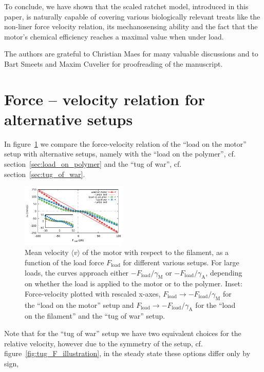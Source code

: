 \documentclass[aps,pre,twocolumn,showpacs,showkeys,superscriptaddress,floatfix]{revtex4-1}
\begin{document}
To conclude, we have shown that the scaled ratchet model, introduced in this paper, is naturally capable of covering various biologically relevant treats like the non-liner force velocity relation,  its mechanosensing ability and the fact that the motor's chemical efficiency reaches a maximal value when under load. 

\begin{acknowledgments}
The authors are grateful to Christian Maes for many valuable discussions and to Bart Smeets and Maxim Cuvelier for proofreading of the manuscript.
\end{acknowledgments}

\appendix 
\section{Force -- velocity relation for alternative setups}
\label{sec:force_velocity_other}
In figure~\ref{fig:F_v_setups} we compare the force-velocity relation of the ``load on the motor'' setup with alternative setups,
namely with the ``load on the polymer'', cf. section~\ref{sec:load_on_polymer} and the ``tug of war'', cf. section~\ref{sec:tug_of_war}.
\begin{figure}[t]
\centering
\includegraphics[width=0.45\textwidth,height=!]{F_v_setups}
\caption{
\label{fig:F_v_setups} 
Mean velocity $\langle v \rangle$ of the motor with respect to the filament, as a function of the load force $F_\text{load}$ for different various setups.
For large loads, the curves approach either  $ - F_\text{load} / \gamma_\text{M}$ or $ - F_\text{load} / \gamma_\text{A}$, depending on whether the load is applied to the motor or to the polymer. 
Inset: Force-velocity plotted with rescaled x-axes,
$F_\text{load} \to - F_\text{load} / \gamma_\text{M}$ for the ``load on the motor'' setup 
and $F_\text{load} \to - F_\text{load} / \gamma_\text{A}$ for the ``load on the filament'' and the ``tug of war'' setup. 
}
\end{figure}
Note that for the ``tug of war'' setup we have two equivalent choices for the relative velocity,
however due to the symmetry of the setup, cf. figure~\ref{fig:tug_F_illustration}, in the steady state these options differ only by sign, 
\end{document}
